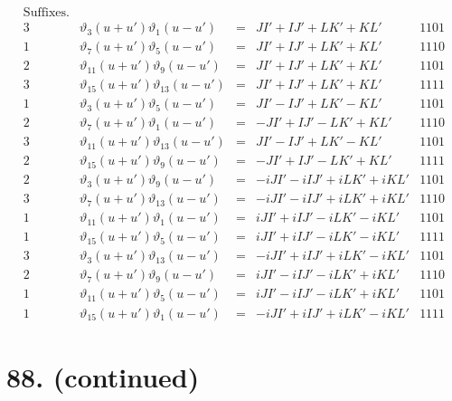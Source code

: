 \documentclass[11pt,a4paper]{article}
\newcommand{\uth}[1]{\vartheta_{#1}}
\begin{document}
\[
\begin{array}{ccccc}
\text{Suffixes.} & & & & \\
\hline
3 & \uth{3}(u+u')\uth{1}(u-u') &=& JI' + IJ' + LK' + KL' & 1101 \\
1 & \uth{7}(u+u')\uth{5}(u-u') &=& JI' + IJ' + LK' + KL' & 1110 \\
2 & \uth{11}(u+u')\uth{9}(u-u') &=& JI' + IJ' + LK' + KL' & 1101 \\
3 & \uth{15}(u+u')\uth{13}(u-u') &=& JI' + IJ' + LK' + KL' & 1111 \\
\hline
1 & \uth{3}(u+u')\uth{5}(u-u') &=& JI' - IJ' + LK' - KL' & 1101 \\
2 & \uth{7}(u+u')\uth{1}(u-u') &=& -JI' + IJ' - LK' + KL' & 1110 \\
3 & \uth{11}(u+u')\uth{13}(u-u') &=& JI' - IJ' + LK' - KL' & 1101 \\
2 & \uth{15}(u+u')\uth{9}(u-u') &=& -JI' + IJ' - LK' + KL' & 1111 \\
\hline
2 & \uth{3}(u+u')\uth{9}(u-u') &=& -iJI' - iIJ' + iLK' + iKL' & 1101 \\
3 & \uth{7}(u+u')\uth{13}(u-u') &=& -iJI' - iIJ' + iLK' + iKL' & 1110 \\
1 & \uth{11}(u+u')\uth{1}(u-u') &=& iJI' + iIJ' - iLK' - iKL' & 1101 \\
1 & \uth{15}(u+u')\uth{5}(u-u') &=& iJI' + iIJ' - iLK' - iKL' & 1111 \\
\hline
3 & \uth{3}(u+u')\uth{13}(u-u') &=& -iJI' + iIJ' + iLK' - iKL' & 1101 \\
2 & \uth{7}(u+u')\uth{9}(u-u') &=& iJI' - iIJ' - iLK' + iKL' & 1110 \\
1 & \uth{11}(u+u')\uth{5}(u-u') &=& iJI' - iIJ' - iLK' + iKL' & 1101 \\
1 & \uth{15}(u+u')\uth{1}(u-u') &=& -iJI' + iIJ' + iLK' - iKL' & 1111
\end{array}
\]

\newpage
\section*{88. (continued)}
\label{sec:88cont2}
\end{document}

